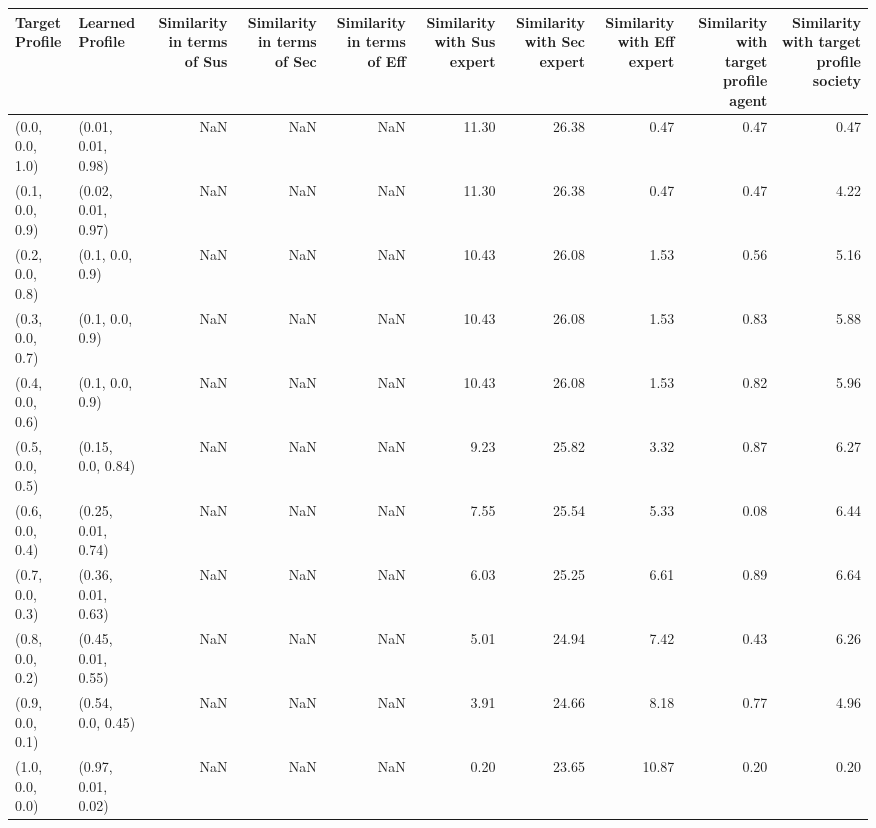 \begin{tabular}{llrrrrrrrr}
\toprule
Target Profile & Learned Profile & Similarity in terms of Sus & Similarity in terms of Sec & Similarity in terms of Eff & Similarity with Sus expert & Similarity with Sec expert & Similarity with Eff expert & Similarity with target profile agent & Similarity with target profile society \\
\midrule
(0.0, 0.0, 1.0) & (0.01, 0.01, 0.98) & NaN & NaN & NaN & 11.30 & 26.38 & 0.47 & 0.47 & 0.47 \\
(0.1, 0.0, 0.9) & (0.02, 0.01, 0.97) & NaN & NaN & NaN & 11.30 & 26.38 & 0.47 & 0.47 & 4.22 \\
(0.2, 0.0, 0.8) & (0.1, 0.0, 0.9) & NaN & NaN & NaN & 10.43 & 26.08 & 1.53 & 0.56 & 5.16 \\
(0.3, 0.0, 0.7) & (0.1, 0.0, 0.9) & NaN & NaN & NaN & 10.43 & 26.08 & 1.53 & 0.83 & 5.88 \\
(0.4, 0.0, 0.6) & (0.1, 0.0, 0.9) & NaN & NaN & NaN & 10.43 & 26.08 & 1.53 & 0.82 & 5.96 \\
(0.5, 0.0, 0.5) & (0.15, 0.0, 0.84) & NaN & NaN & NaN & 9.23 & 25.82 & 3.32 & 0.87 & 6.27 \\
(0.6, 0.0, 0.4) & (0.25, 0.01, 0.74) & NaN & NaN & NaN & 7.55 & 25.54 & 5.33 & 0.08 & 6.44 \\
(0.7, 0.0, 0.3) & (0.36, 0.01, 0.63) & NaN & NaN & NaN & 6.03 & 25.25 & 6.61 & 0.89 & 6.64 \\
(0.8, 0.0, 0.2) & (0.45, 0.01, 0.55) & NaN & NaN & NaN & 5.01 & 24.94 & 7.42 & 0.43 & 6.26 \\
(0.9, 0.0, 0.1) & (0.54, 0.0, 0.45) & NaN & NaN & NaN & 3.91 & 24.66 & 8.18 & 0.77 & 4.96 \\
(1.0, 0.0, 0.0) & (0.97, 0.01, 0.02) & NaN & NaN & NaN & 0.20 & 23.65 & 10.87 & 0.20 & 0.20 \\
\bottomrule
\end{tabular}
